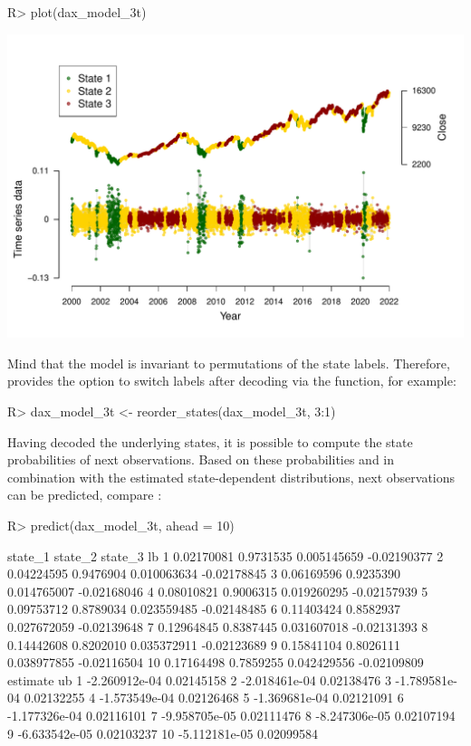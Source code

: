\documentclass[article]{jss}
\newcommand{\fct}[1]{\code{#1()}}
\begin{document}
%
\begin{Schunk}
\begin{Sinput}
R> plot(dax_model_3t)
\end{Sinput}
\end{Schunk}
\includegraphics{fhmm_oelschlaeger_adam_michels-dec_ts}
%

Mind that the model is invariant to permutations of the state labels. Therefore,  provides the option to switch labels after decoding via the \fct{reorder\_states} function, for example:

%
\begin{Schunk}
\begin{Sinput}
R> dax_model_3t <- reorder_states(dax_model_3t, 3:1)
\end{Sinput}
\end{Schunk}
%

Having decoded the underlying states, it is possible to compute the state probabilities of next observations. Based on these probabilities and in combination with the estimated state-dependent distributions, next observations can be predicted, compare \cite{zuc16}:

%
\begin{Schunk}
\begin{Sinput}
R> predict(dax_model_3t, ahead = 10)
\end{Sinput}
\begin{Soutput}
      state_1   state_2     state_3          lb
1  0.02170081 0.9731535 0.005145659 -0.02190377
2  0.04224595 0.9476904 0.010063634 -0.02178845
3  0.06169596 0.9235390 0.014765007 -0.02168046
4  0.08010821 0.9006315 0.019260295 -0.02157939
5  0.09753712 0.8789034 0.023559485 -0.02148485
6  0.11403424 0.8582937 0.027672059 -0.02139648
7  0.12964845 0.8387445 0.031607018 -0.02131393
8  0.14442608 0.8202010 0.035372911 -0.02123689
9  0.15841104 0.8026111 0.038977855 -0.02116504
10 0.17164498 0.7859255 0.042429556 -0.02109809
        estimate         ub
1  -2.260912e-04 0.02145158
2  -2.018461e-04 0.02138476
3  -1.789581e-04 0.02132255
4  -1.573549e-04 0.02126468
5  -1.369681e-04 0.02121091
6  -1.177326e-04 0.02116101
7  -9.958705e-05 0.02111476
8  -8.247306e-05 0.02107194
9  -6.633542e-05 0.02103237
10 -5.112181e-05 0.02099584
\end{Soutput}
\end{Schunk}
%
\end{document}
